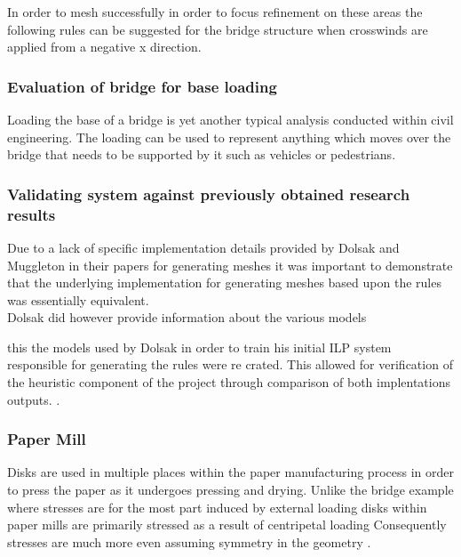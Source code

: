 \cite{CrosswindsOnSuspensionBridges}

In order to mesh successfully in order to focus refinement on these areas the following rules can be suggested for the bridge structure when crosswinds are applied from a negative x direction.



\subsubsection{Evaluation of bridge for base loading}
Loading the base of a bridge is yet another typical analysis conducted within civil engineering. The loading can be used to represent anything which moves over the bridge that needs to be supported by it such as vehicles or pedestrians. 


\subsubsection{Validating system against previously obtained research results}
Due to a lack of specific implementation details provided by Dolsak and Muggleton in their papers for generating meshes it was important to demonstrate that the underlying implementation for generating meshes based upon the rules was essentially equivalent. \\ 


Dolsak did however provide information about the various models 

this the models used by Dolsak in order to train his initial ILP system responsible for generating the rules were re crated. This allowed for verification of the heuristic component of the project through comparison of both implentations outputs. \cite{DolsakPaper91}.


\subsubsection{Paper Mill}
Disks are used in multiple places within the paper manufacturing process in order to press the paper as it undergoes pressing and drying. Unlike the bridge example where stresses are for the most part induced by external loading disks within paper mills are primarily stressed as a result of centripetal loading \cite{} Consequently stresses are much more even assuming symmetry in the geometry \cite{RotatingDiskFE}.


